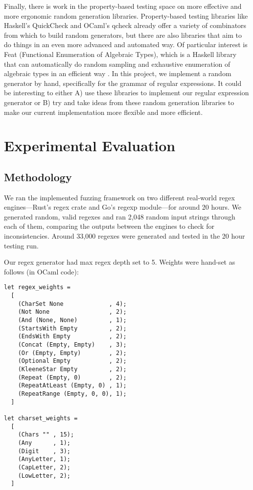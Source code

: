 \documentclass[acmsmall,nonacm,screen]{acmart}
\begin{document}
Finally, there is work in the property-based testing space on more effective and more ergonomic random generation libraries. Property-based testing libraries like Haskell's QuickCheck \cite{claessen2000quickcheck} and OCaml's qcheck already offer a variety of combinators from which to build random generators, but there are also libraries that aim to do things in an even more advanced and automated way. Of particular interest is Feat (Functional Enumeration of Algebraic Types), which is a Haskell library that can automatically do random sampling and exhaustive enumeration of algebraic types in an efficient way \cite{duregaard2012feat}. In this project, we implement a random generator by hand, specifically for the grammar of regular expressions. It could be interesting to either A) use these libraries to implement our regular expression generator or B) try and take ideas from these random generation libraries to make our current implementation more flexible and more efficient.

\section{Experimental Evaluation}
\subsection{Methodology}
We ran the implemented fuzzing framework on two different real-world regex engines---Rust's regex crate and Go's regexp module---for around 20 hours. We generated random, valid regexes and ran 2,048 random input strings through each of them, comparing the outputs between the engines to check for inconsistencies. Around 33,000 regexes were generated and tested in the 20 hour testing run.

Our regex generator had max regex depth set to 5. Weights were hand-set as follows (in OCaml code):

\begin{verbatim}
let regex_weights =
  [
    (CharSet None             , 4);
    (Not None                 , 2);
    (And (None, None)         , 1);
    (StartsWith Empty         , 2);
    (EndsWith Empty           , 2);
    (Concat (Empty, Empty)    , 3);
    (Or (Empty, Empty)        , 2);
    (Optional Empty           , 2);
    (KleeneStar Empty         , 2);
    (Repeat (Empty, 0)        , 2);
    (RepeatAtLeast (Empty, 0) , 1);
    (RepeatRange (Empty, 0, 0), 1);
  ]

let charset_weights =
  [
    (Chars "" , 15);
    (Any      , 1);
    (Digit    , 3);
    (AnyLetter, 1);
    (CapLetter, 2);
    (LowLetter, 2);
  ]
\end{verbatim}
\end{document}

